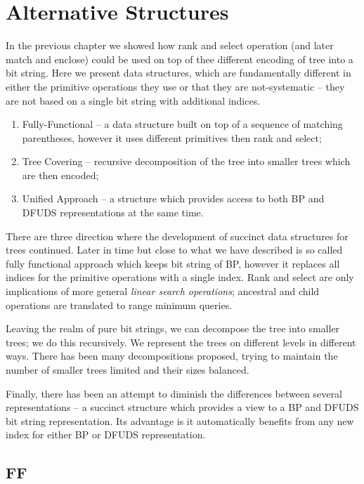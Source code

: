 \chapter{Alternative Structures}

In the previous chapter we showed how rank and select operation (and later match and enclose) could be used on top of thee different encoding of tree into a bit string.
Here we present data structures, which are fundamentally different in either the primitive operations they use or that they are not-systematic -- they are not based on a single bit string with additional indices.

\begin{enumerate}
	\item Fully-Functional -- a data structure built on top of a sequence of matching parentheses, however it uses different primitives then rank and select;
	\item Tree Covering -- recursive decomposition of the tree into smaller trees which are then encoded;
	\item Unified Approach -- a structure which provides access to both BP and DFUDS representations at the same time.
\end{enumerate}

There are three direction where the development of succinct data structures for trees continued.
Later in time but close to what we have described is so called fully functional approach which keeps bit string of BP, however it replaces all indices for the primitive operations with a single index.
Rank and select are only implications of more general \emph{linear search operations}; ancestral and child operations are translated to range minimum queries.

Leaving the realm of pure bit strings, we can decompose the tree into smaller trees; we do this recursively.
We represent the trees on different levels in different ways.
There has been many decompositions proposed, trying to maintain the number of smaller trees limited and their sizes balanced.

Finally, there has been an attempt to diminish the differences between several representations -- a succinct structure which provides a view to a BP and DFUDS bit string representation.
Its advantage is it automatically benefits from any new index for either BP or DFUDS representation.

\section{FF}

